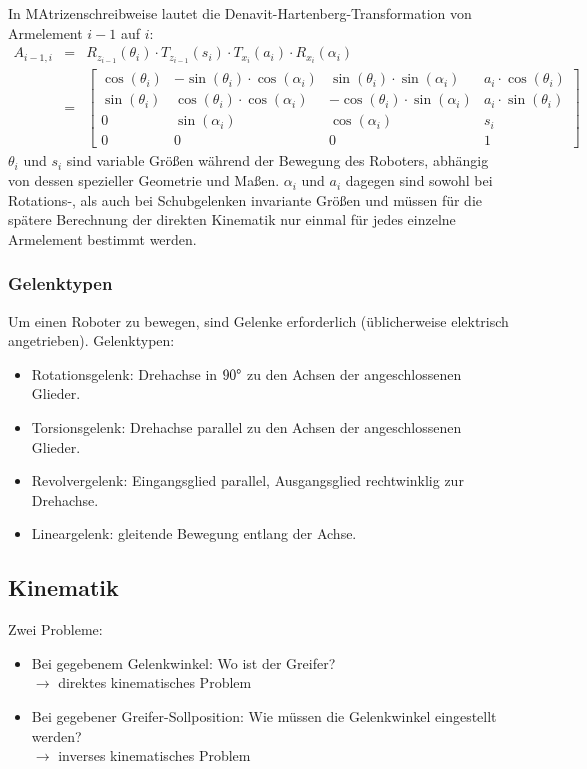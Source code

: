 In MAtrizenschreibweise lautet die Denavit-Hartenberg-Transformation von Armelement $i-1$ auf $i$:
\begin{eqnarray*}
A_{i-1,i} &=& R_{z_{i-1}}(\theta_i) \cdot T_{z_{i-1}}(s_i) \cdot T_{x_i}(a_i) \cdot R_{x_i}(\alpha_i) \\
&=& \left[ \begin{array}{cccc} \cos(\theta_i) & - \sin(\theta_i) \cdot \cos(\alpha_i) & \sin(\theta_i) \cdot \sin(\alpha_i) & a_i \cdot \cos(\theta_i) \\ \sin(\theta_i) & \cos(\theta_i) \cdot \cos(\alpha_i) & - \cos(\theta_i) \cdot \sin(\alpha_i) & a_i \cdot \sin(\theta_i) \\ 0 & \sin(\alpha_i) & \cos(\alpha_i) & s_i \\ 0 & 0 & 0 & 1 \end{array} \right]
\end{eqnarray*}
$\theta_i$ und $s_i$ sind variable Größen während der Bewegung des Roboters, abhängig von dessen spezieller Geometrie und Maßen. $\alpha_i$ und $a_i$ dagegen sind sowohl bei Rotations-, als auch bei Schubgelenken invariante Größen und müssen für die spätere Berechnung der direkten Kinematik nur einmal für jedes einzelne Armelement bestimmt werden.

\subsubsection*{Gelenktypen}

Um einen Roboter zu bewegen, sind Gelenke erforderlich (üblicherweise elektrisch angetrieben). Gelenktypen:
\begin{itemize}
\item Rotationsgelenk: Drehachse in $90\degree$ zu den Achsen der angeschlossenen Glieder.
\item Torsionsgelenk: Drehachse parallel zu den Achsen der angeschlossenen Glieder.
\item Revolvergelenk: Eingangsglied parallel, Ausgangsglied rechtwinklig zur Drehachse.
\item Lineargelenk: gleitende Bewegung entlang der Achse.
\end{itemize}

\subsection{Kinematik}

Zwei Probleme:
\begin{itemize}
\item Bei gegebenem Gelenkwinkel: Wo ist der Greifer? \\ $\to$ direktes kinematisches Problem
\item Bei gegebener Greifer-Sollposition: Wie müssen die Gelenkwinkel eingestellt werden? \\ $\to$ inverses kinematisches Problem
\end{itemize}

